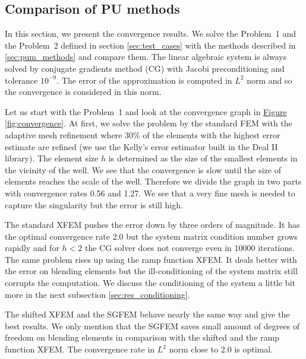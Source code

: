 \documentclass{elsarticle}
\newcommand{\prob}[1]{Problem~{#1}}
\newcommand{\fig}[1]{\hyperref[#1]{Figure \ref{#1}}}
\begin{document}
\subsection{Comparison of PU methods} \label{sec:res_comparison}
In this section, we present the convergence results. We solve the \prob{1} and the \prob{2} 
defined in section \ref{sec:test_cases} with the methods described in \ref{sec:pum_methods} and compare them.
The linear algebraic system is always solved by conjugate gradients method (CG) with Jacobi preconditioning 
and tolerance $10^{-9}$. The error of the approximation is computed in $L^2$ norm and so the convergence is
considered in this norm.

Let us start with the \prob{1} and look at the convergence graph in \fig{fig:convergence}.
At first, we solve the problem by the standard FEM with the adaptive mesh refinement where 30\% of the elements
with the highest error estimate are refined (we use the Kelly's error estimator built in the Deal II library).
The element size $h$ is determined as the size of the smallest elements in the 
vicinity of the well. We see that the convergence is slow until the size of elements reaches the scale of the
well. Therefore we divide the graph in two parts with convergence rates 0.56 and 1.27.
We see that a very fine mesh is needed to capture the singularity but the error is still high.

The standard XFEM pushes the error down by three orders of magnitude. It has the optimal convergence rate 2.0 but the system
matrix condition number grows rapidly and for $h<2$ the CG solver does not converge even in 10000 iterations. The same
problem rises up using the ramp function XFEM. It deals better with the error on blending elements but the
ill-conditioning of the system matrix still corrupts the computation. We discuss the conditioning of the system 
a little bit more in the next subsection \ref{sec:res_conditioning}.

The shifted XFEM and the SGFEM behave nearly the same way and give the best results. We only mention that the SGFEM saves 
small amount of degrees of freedom on blending elements in comparison with the shifted and the ramp function XFEM.
The convergence rate in $L^2$ norm close to 2.0 is optimal.
\end{document}
